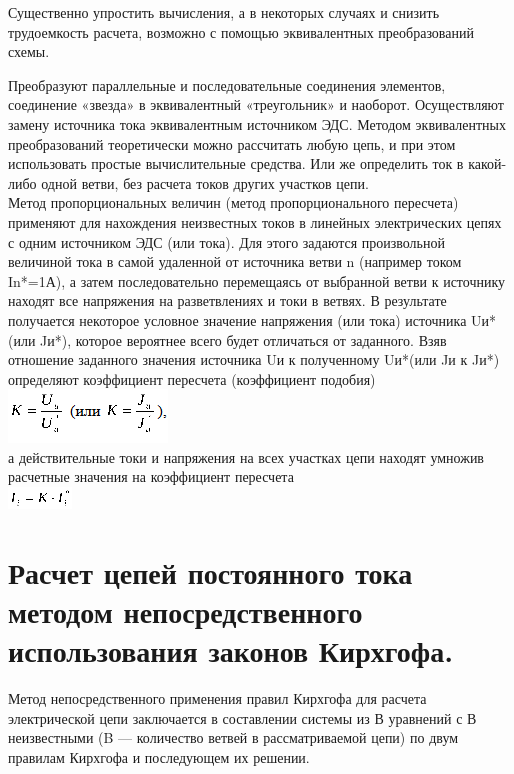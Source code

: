 \documentclass[a4paper, 12pt]{article}
\begin{document}
Существенно упростить вычисления, а в некоторых случаях и снизить трудоемкость расчета, возможно с помощью эквивалентных преобразований схемы.

Преобразуют параллельные и последовательные соединения элементов, соединение «звезда» в эквивалентный «треугольник» и наоборот. Осуществляют замену источника тока эквивалентным источником ЭДС. Методом эквивалентных преобразований теоретически можно рассчитать любую цепь, и при этом использовать простые вычислительные средства. Или же определить ток в какой-либо одной ветви, без расчета токов других участков цепи.\\

Метод пропорциональных величин (метод пропорционального пересчета) применяют для нахождения неизвестных токов в линейных электрических цепях с одним источником ЭДС (или тока). Для этого задаются произвольной величиной тока в самой удаленной от источника ветви n (например током In*=1А), а затем последовательно перемещаясь от выбранной ветви к источнику находят все напряжения на разветвлениях и токи в ветвях. В результате получается некоторое условное значение напряжения (или тока) источника Uи*(или Jи*), которое вероятнее всего будет отличаться от заданного. Взяв отношение заданного значения источника Uи к полученному Uи*(или Jи к Jи*) определяют коэффициент пересчета (коэффициент подобия)\\
\includegraphics{15-1.png}\\
а действительные токи и напряжения на всех участках цепи находят умножив расчетные значения на коэффициент пересчета\\
\includegraphics{15-2.png}\\
\section{Расчет цепей постоянного тока методом непосредственного использования законов Кирхгофа.}
Метод непосредственного применения правил Кирхгофа для расчета электрической цепи заключается в составлении системы из В уравнений с В неизвестными (B — количество ветвей в рассматриваемой цепи) по двум правилам Кирхгофа и последующем их решении.\\
\end{document}
